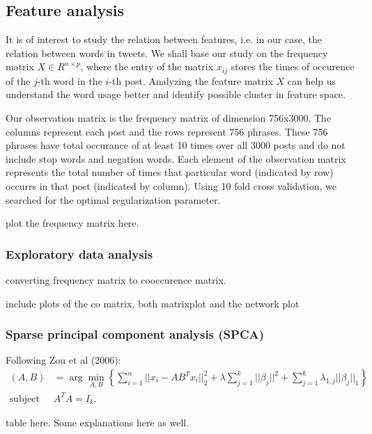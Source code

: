 \documentclass[11pt]{article}
\newcommand{\1}[1]{{\mathbf 1}\left\{#1\right\}}        %
\begin{document}
\subsection{Feature analysis}
It is of interest to study the relation between features, i.e. in our case, the relation between words in tweets. We shall base our study on the frequency matrix $X\in R^{n\times p}$, where the entry of the matrix $x_{ij}$ stores the times of occurence of the $j$-th word in the $i$-th post. Analyzing the feature matrix $X$ can help us understand the word usage better and identify possible cluster in feature space. 

Our observation matrix is the frequency matrix of dimension 756x3000. The columns represent each post and the rows represent 756 phrases.  These 756 phrases have total occurance of at least 10 times over all 3000 posts and do not include stop words and negation words. Each element of the observation matrix represents the total number of times that particular word (indicated by row) occurrs in that post (indicated by column). Using 10 fold cross validation, we searched for the optimal regularization parameter. 

plot the frequency matrix here.

\subsubsection{Exploratory data analysis}
converting frequency matrix to cooccurence matrix. 

include plots of the co matrix, both matrixplot and the network plot 

\subsubsection{Sparse principal component analysis (SPCA)}
Following Zou et al (2006):
\begin{align}
(A,B) & = \arg \min_{A,B} \left \{ \sum_{i=1}^n||x_i-AB^Tx_i||_2^2 + \lambda \sum_{j=1}^k||\beta_j||^2 + \sum_{j=1}^k\lambda_{1,j}||\beta_j||_1 \right\} \\ 
\text{subject to } & A^TA = I_{k}. \nonumber
\end{align}

table here. Some explanations here as well.

\end{document}
